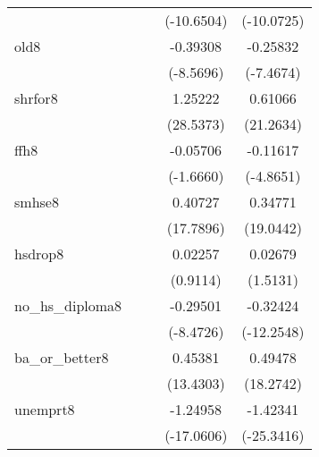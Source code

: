 \documentclass{article}
\begin{document}
{\begin{longtable}{l*{4}{c}}
                    &                     &                     &  (-10.6504)         &  (-10.0725)         \\
[1em]
old8                &                     &                     &    -0.39308\sym{***}&    -0.25832\sym{***}\\
                    &                     &                     &   (-8.5696)         &   (-7.4674)         \\
[1em]
shrfor8             &                     &                     &     1.25222\sym{***}&     0.61066\sym{***}\\
                    &                     &                     &   (28.5373)         &   (21.2634)         \\
[1em]
ffh8                &                     &                     &    -0.05706         &    -0.11617\sym{***}\\
                    &                     &                     &   (-1.6660)         &   (-4.8651)         \\
[1em]
smhse8              &                     &                     &     0.40727\sym{***}&     0.34771\sym{***}\\
                    &                     &                     &   (17.7896)         &   (19.0442)         \\
[1em]
hsdrop8             &                     &                     &     0.02257         &     0.02679         \\
                    &                     &                     &    (0.9114)         &    (1.5131)         \\
[1em]
no\_hs\_diploma8      &                     &                     &    -0.29501\sym{***}&    -0.32424\sym{***}\\
                    &                     &                     &   (-8.4726)         &  (-12.2548)         \\
[1em]
ba\_or\_better8       &                     &                     &     0.45381\sym{***}&     0.49478\sym{***}\\
                    &                     &                     &   (13.4303)         &   (18.2742)         \\
[1em]
unemprt8            &                     &                     &    -1.24958\sym{***}&    -1.42341\sym{***}\\
                    &                     &                     &  (-17.0606)         &  (-25.3416)         \\

\end{longtable}}
\end{document}
